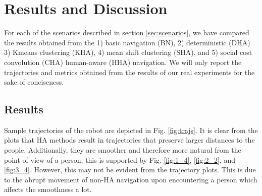 \section{Results and Discussion}
\label{res}

For each of the scenarios described in section \ref{sec:scenarios}, we have compared the results obtained from the 1) basic navigation (BN), 2) deterministic (DHA) 3) Kmeans clustering (KHA), 4) mean shift clustering (SHA), and 5) social cost convolution (CHA) human-aware (HHA) navigation. We will only report the trajectories and metrics obtained from the results of our real experiments for the sake of conciseness.






\subsection{Results}
\label{sec:results}

Sample trajectories of the robot are depicted in Fig. \ref{fig:trajs}. It is clear from the plots that HA methods result in trajectories that preserve larger distances to the people. Additionally, they are smoother and therefore more natural from the point of view of a person, this is supported by Fig. \ref{fig:1_4}, \ref{fig:2_2}, and \ref{fig:3_4}. However, this may not be evident from the trajectory plots. This is due to the abrupt movement of non-HA navigation upon encountering a person which affects the smoothness a lot. 

